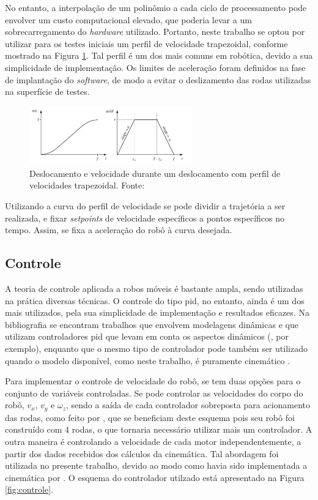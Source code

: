 No entanto, a interpolação de um polinômio a cada ciclo de processamento pode envolver um custo computacional elevado, que poderia levar a um sobrecarregamento do \textit{hardware} utilizado. Portanto, neste trabalho se optou por utilizar para os testes iniciais um perfil de velocidade trapezoidal, conforme mostrado na Figura \ref{fig:trap}. Tal perfil é um dos mais comuns em robótica, devido a sua simplicidade de implementação. Os limites de aceleração foram definidos na fase de implantação do \textit{software}, de modo a evitar o deslizamento das rodas utilizadas na superfície de testes.

\begin{figure}[h]
  \centering
  \includegraphics[width = 0.63\textwidth]{imagens/trapezoidal}
  \caption{Deslocamento e velocidade durante um deslocamento com perfil de velocidades trapezoidal. Fonte: \citet{lynch2017modern}}
  \label{fig:trap}
\end{figure}

Utilizando a curva do perfil de velocidade se pode dividir a trajetória a ser realizada, e fixar \textit{setpoints} de velocidade específicos a pontos específicos no tempo. Assim, se fixa a aceleração do robô à curva desejada.

\subsection{Controle}

A teoria de controle aplicada a robos móveis é bastante ampla, sendo utilizadas na prática diversas técnicas. O controle do tipo \acrshort{pid}, no entanto, ainda é um dos mais utilizados, pela sua simplicidade de implementação e resultados eficazes. Na bibliografia se encontram trabalhos que envolvem modelagens dinâmicas e que utilizam controladores \acrshort{pid} que levam em conta os aspectos dinâmicos (\citet{samani2007comprehensive}, por exemplo), enquanto que o mesmo tipo de controlador pode também ser utilizado quando o modelo disponível, como neste trabalho, é puramente cinemático \citep{indiveri2009swedish}.

Para implementar o controle de velocidade do robô, se tem duas opções para o conjunto de variáveis controladas. Se pode controlar as velocidades do corpo do robô, $v_x$, $v_y$ e $\omega_z$, sendo a saída de cada controlador sobreposta para acionamento das rodas, como feito por \citet{rojas2006holonomic}, que se beneficiam deste esquema pois seu robô foi construído com 4 rodas, o que tornaria necessário utilizar mais um controlador. A outra maneira é controlando a velocidade de cada motor independentemente, a partir dos dados recebidos dos cálculos da cinemática. Tal abordagem foi utilizada no presente trabalho, devido ao modo como havia sido implementada a cinemática por \cite{ritter2016modelagem}. O esquema do controlador utilzado está apresentado na Figura \ref{fig:controle}.

